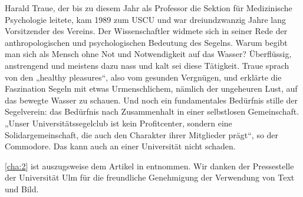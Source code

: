 Harald Traue, der bis zu diesem Jahr als Professor die Sektion für Medizinische Psychologie leitete, kam 1989 zum USCU und war dreiundzwanzig Jahre lang Vorsitzender des Vereins. Der Wissenschaftler widmete sich in seiner Rede der anthropologischen und psychologischen Bedeutung des Segelns. Warum begibt man sich als Mensch ohne Not und Notwendigkeit auf das Wasser? Überflüssig, anstrengend und meistens dazu nass und kalt sei diese Tätigkeit. Traue sprach von den „healthy pleasures“, also vom gesunden Vergnügen, und erklärte die Faszination Segeln mit etwas Urmenschlichem, nämlich der ungeheuren Lust, auf das bewegte Wasser zu schauen. Und noch ein fundamentales Bedürfnis stille der Segelverein: das Bedürfnis nach Zusammenhalt in einer selbstlosen Gemeinschaft. „Unser Universitätssegelclub ist kein Profitcenter, sondern eine Solidargemeinschaft, die auch den Charakter ihrer Mitglieder prägt“, so der Commodore. Das kann auch an einer Universität nicht schaden. 

\cref{cha:2} ist auszugsweise dem Artikel in \cite[S. 54--56]{uni-ulm-intern} entnommen. Wir danken der Pressestelle der Universität Ulm für die freundliche Genehmigung der Verwendung von Text und Bild.